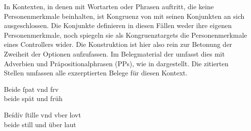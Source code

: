 In Kontexten, in denen  mit Wortarten oder Phrasen
auftritt, die keine Personenmerkmale beinhalten, ist Kongruenz von
 mit seinen Konjunkten an sich ausgeschlossen. Die Konjunkte
definieren in diesen Fällen weder ihre eigenen Personen\-merkmale, noch
spiegeln sie als Kongruenztargets die Personenmerkmale eines Controllers wider.
Die Konstruktion ist hier also rein zur Betonung der Zweiheit der Optionen
aufzufassen. Im Belegmaterial der \KC{} umfasst dies  mit Adverbien und Präpositionalphrasen (PPs), wie in
 dargestellt. Die zitierten Stellen
umfassen alle exzerptierten Belege für diesen Kontext.

\begin{exe}
\ex \label{ex:syntintvar1}
	\begin{xlist}
	\ex \begin{taggedline}{\parencites[\pno~18rb,5]{kc:B1}[vgl.~abweichend][6289]{schroeder1895}}
	\end{taggedline}

	\ex \begin{taggedline}{\parencites[\pno~19va,15]{kc:B1}[zu][6834--6839]{schroeder1895}}
	\end{taggedline}

	\ex \label{ex:syntintvar1_3}
	\gll Beide ſpat vnd frv \\
		beide spät und früh \\
	\begin{taggedline}{\parencites[\pno~33ra,36]{kc:VB}[zu][6834--6839]{schroeder1895}}
	\trans {}
	\end{taggedline}
\end{xlist}

\ex \label{ex:syntintvar3}
	\begin{xlist}
	\ex \begin{taggedline}{\parencites[\pno~22va,1]{kc:B1}[zu][8014--8020]{schroeder1895}}
	\end{taggedline}

	\ex \label{ex:syntintvar3_2}
		\gll Beídív ſtille vnd vber lovt \\
		beide still und über laut \\
	\begin{taggedline}{\parencites[\pno~38vb,24]{kc:VB}[zu][8014--8020]{schroeder1895}}
	\trans {}
	\end{taggedline}
\end{xlist}
\end{exe}

